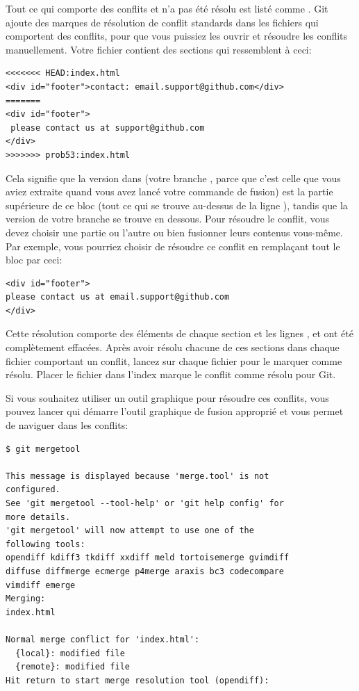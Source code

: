 Tout ce qui comporte des conflits et n'a pas été résolu est listé comme .
Git ajoute des marques de résolution de conflit standards dans les fichiers qui comportent des conflits, pour que vous puissiez les ouvrir et résoudre les conflits manuellement.
Votre fichier contient des sections qui ressemblent à ceci:
\begin{Schunk}
\begin{Verbatim}
<<<<<<< HEAD:index.html
<div id="footer">contact: email.support@github.com</div>
=======
<div id="footer">
 please contact us at support@github.com
</div>
>>>>>>> prob53:index.html
\end{Verbatim}
\end{Schunk}

Cela signifie que la version dans  (votre branche , parce que c'est celle que vous aviez extraite quand vous avez lancé votre commande de fusion) est la partie supérieure de ce bloc (tout ce qui se trouve au-dessus de la ligne \code{=======}), tandis que la version de votre branche  se trouve en dessous.
Pour résoudre le conflit, vous devez choisir une partie ou l'autre ou bien fusionner leurs contenus vous-même.
Par exemple, vous pourriez choisir de résoudre ce conflit en remplaçant tout le bloc par ceci:
\begin{Schunk}
\begin{Verbatim}
<div id="footer">
please contact us at email.support@github.com
</div>
\end{Verbatim}
\end{Schunk}

Cette résolution comporte des éléments de chaque section et les lignes \code{<<<<<<<}, \code{=======} et \code{>>>>>>>} ont été complètement effacées.
Après avoir résolu chacune de ces sections dans chaque fichier comportant un conflit, lancez  sur chaque fichier pour le marquer comme résolu.
Placer le fichier dans l'index marque le conflit comme résolu pour Git.

Si vous souhaitez utiliser un outil graphique pour résoudre ces conflits, vous pouvez lancer  qui démarre l'outil graphique de fusion approprié et vous permet de naviguer dans les conflits:
\begin{Schunk}
\begin{Verbatim}
$ git mergetool

This message is displayed because 'merge.tool' is not
configured.
See 'git mergetool --tool-help' or 'git help config' for
more details.
'git mergetool' will now attempt to use one of the
following tools:
opendiff kdiff3 tkdiff xxdiff meld tortoisemerge gvimdiff
diffuse diffmerge ecmerge p4merge araxis bc3 codecompare
vimdiff emerge
Merging:
index.html

Normal merge conflict for 'index.html':
  {local}: modified file
  {remote}: modified file
Hit return to start merge resolution tool (opendiff):
\end{Verbatim}
\end{Schunk}

